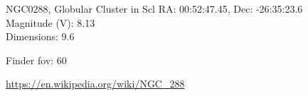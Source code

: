 \begin{block}{NGC0288, Globular Cluster in Scl}
    RA: 00:52:47.45, Dec: -26:35:23.6 \\ 
    Magnitude (V): 8.13 \\ 
    Dimensions: 9.6 

    Finder fov: 60 

    \url{https://en.wikipedia.org/wiki/NGC_288} 
\end{block}